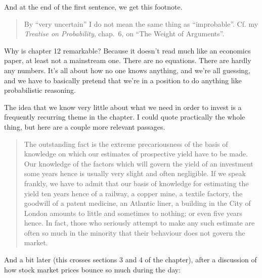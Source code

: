 \documentclass[
  11pt,
  letterpaper,
  DIV=11,
  numbers=noendperiod,
  oneside]{scrartcl}
\begin{document}
And at the end of the first sentence, we get this footnote.

\begin{quote}
By ``very uncertain'' I do not mean the same thing as ``improbable''.
Cf. my \emph{Treatise on Probability}, chap.~6, on ``The Weight of
Arguments''.
\end{quote}

Why is chapter 12 remarkable? Because it doesn't read much like an
economics paper, at least not a mainstream one. There are no equations.
There are hardly any numbers. It's all about how no one knows anything,
and we're all guessing, and we have to basically pretend that we're in a
position to do anything like probabilistic reasoning.

The idea that we know very little about what we need in order to invest
is a frequently recurring theme in the chapter. I could quote
practically the whole thing, but here are a couple more relevant
passages.

\begin{quote}
The outstanding fact is the extreme precariousness of the basis of
knowledge on which our estimates of prospective yield have to be made.
Our knowledge of the factors which will govern the yield of an
investment some years hence is usually very slight and often negligible.
If we speak frankly, we have to admit that our basis of knowledge for
estimating the yield ten years hence of a railway, a copper mine, a
textile factory, the goodwill of a patent medicine, an Atlantic liner, a
building in the City of London amounts to little and sometimes to
nothing; or even five years hence. In fact, those who seriously attempt
to make any such estimate are often so much in the minority that their
behaviour does not govern the market.
\end{quote}

And a bit later (this crosses sections 3 and 4 of the chapter), after a
discussion of how stock market prices bounce so much during the day:
\end{document}
